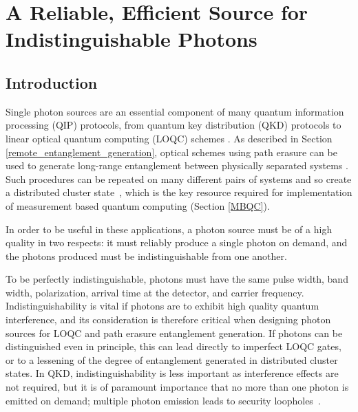 \chapter{A Reliable, Efficient Source for Indistinguishable Photons} 
\label{ch:SinglePhotonSource}

\section{Introduction}

Single photon sources are an essential component of many quantum information processing (QIP) protocols, from quantum key distribution (QKD) protocols \cite{bennett_brassard_84, ekert_91} to linear optical quantum computing (LOQC) schemes \cite{knill:2001, kok07, kok10}.
As described in Section \ref{remote_entanglement_generation}, optical schemes using path erasure  can be used to generate long-range entanglement between physically separated systems  \cite{barrett+kok, bose99, simon:03, lim05}. Such procedures can be repeated on many different pairs of systems and so create a distributed cluster state~\cite{raussendorf01,kok10}, which is the key resource required for implementation of measurement based quantum computing (Section \ref{MBQC}).

In order to be useful in these applications, a photon source must be of a high quality in two respects: it must reliably produce a single photon on demand, and the photons produced must be indistinguishable from one another. 

To be perfectly indistinguishable, photons must have the same pulse width, band width, polarization, arrival time at the detector, and carrier frequency. Indistinguishability is vital if photons are to exhibit high quality quantum interference, and its consideration is therefore critical when designing photon sources for LOQC and path erasure entanglement generation.
If photons can be distinguished even in principle, this can lead directly to imperfect LOQC gates, or to a lessening of the degree of entanglement generated in distributed cluster states. In QKD, indistinguishability is less important as interference effects are not required, but it is of paramount importance that no more than one photon is emitted on demand; multiple photon emission leads to security loopholes~\cite{kok10}.

